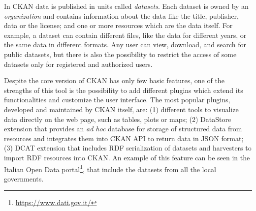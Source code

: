 In CKAN data is published in units called \textit{datasets}. Each dataset is owned by an \textit{organization} and contains information about the data like the title, publisher, data or the license; and one or more resources which are the data itself. For example, a dataset can contain different files, like the data for different years, or the same data in different formats. Any user can view, download, and search for public datasets, but there is also the possibility to restrict the access of some datasets only for registered and authorized users.

Despite the core version of CKAN has only few basic features, one of the strengths of this tool is the possibility to add different plugins which extend its functionalities and customize the user interface. The most popular plugins, developed and maintained by CKAN itself, are: (1) different tools to visualize data directly on the web page, such as tables, plots or maps; (2) DataStore extension that provides an \textit{ad hoc} database for storage of structured data from resources and integrates them into CKAN \acs{API} to return data in \ac{JSON} format; (3) DCAT extension that includes \ac{RDF} serialization of datasets and harvesters to import \ac{RDF} resources into CKAN. An example of this feature can be seen in the Italian Open Data portal\footnote{\url{https://www.dati.gov.it/}}, that include the datasets from all the local governments.